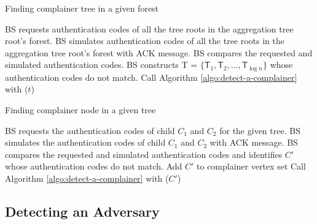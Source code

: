 \documentclass[%
  slidesonly,%
  semlayer%
  ]{seminar}                                  %
\begin{document}
\begin{slide}
        \begin{algorithm}
          \caption{Finding complainer tree in a given forest}
          \label{algo:detect-a-complainer-tree}
          \begin{algorithmic}[1]
            \STATE BS requests authentication codes of all the tree roots in the aggregation tree root's forest.
            \STATE BS simulates authentication codes of all the tree roots in the aggregation tree root's forest with ACK message.
            \STATE BS compares the requested and simulated authentication codes.
            \STATE BS constructs \textsf{T} = $\{\textsf{T}_{1},\textsf{T}_{2},\dotsc,\textsf{T}_{\log{n}}\}$ whose authentication codes do not match.
              \STATE Call Algorithm \ref{algo:detect-a-complainer} with ($t$)     
            \ENDFOR 
          \end{algorithmic}
        \end{algorithm}

        \begin{algorithm}
          \caption{Finding complainer node in a given tree}
          \label{algo:detect-a-complainer}
          \begin{algorithmic}[1]
            \STATE BS requests the authentication codes of child $C_{1}$ and $C_{2}$ for the given tree.
            \STATE BS simulates the authentication codes of child $C_{1}$ and $C_{2}$ with ACK message.
            \STATE BS compares the requested and simulated authentication codes and identifies $C'$ whose authentication codes do not match.
              \STATE Add $C'$ to complainer vertex set  
            \ELSE
              \STATE Call Algorithm \ref{algo:detect-a-complainer} with ($C'$)      
            \ENDIF
          \end{algorithmic}
        \end{algorithm}


        \vfill
        \clearpage

    \subsection*{Detecting an Adversary}
        \vfill
    

\end{slide}
\end{document}
